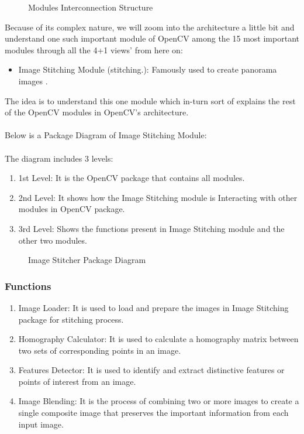 \begin{figure}[H]
     \centering
     \caption{\label{Figure::ModulesStructure} Modules Interconnection Structure}
\end{figure}
Because of its complex nature, we will zoom into the architecture a little bit and understand one such important module of OpenCV among the 15 most important modules through all the 4+1 views' from here on:
\begin{itemize}
         \item Image Stitching Module (stitching.): Famously used to create panorama images \cite{6896208}.  
\end{itemize}
The idea is to understand this one module which in-turn sort of explains the rest of the OpenCV modules in OpenCV's architecture. \\\\
Below is a Package Diagram of Image Stitching Module:\\\\
The diagram includes 3 levels:
\begin{enumerate}
         \item 1st Level: It is the OpenCV package that contains all modules.
         \item 2nd Level: It shows how the Image Stitching module is Interacting with other modules in OpenCV package.
         \item 3rd Level: Shows the functions present in Image Stitching module and the other two modules.
\end{enumerate}

\begin{figure}[H]
     \centering
     \caption{\label{Figure::ImageStitcherPackageDiagram
} Image Stitcher Package Diagram}
\end{figure}

\subsubsection{Functions\label{subsubSection::Functions}}
\begin{enumerate}
         \item Image Loader: It is used to load and prepare the images in Image Stitching package for stitching process.
         \item Homography Calculator: It is used to calculate a homography matrix between two sets of corresponding points in an image. 
         \item Features Detector: It is used to identify and extract distinctive features or points of interest from an image.
         \item Image Blending: It is the process of combining two or more images to create a single composite image that preserves the important information from each input image. 
\end{enumerate}
\pagebreak

